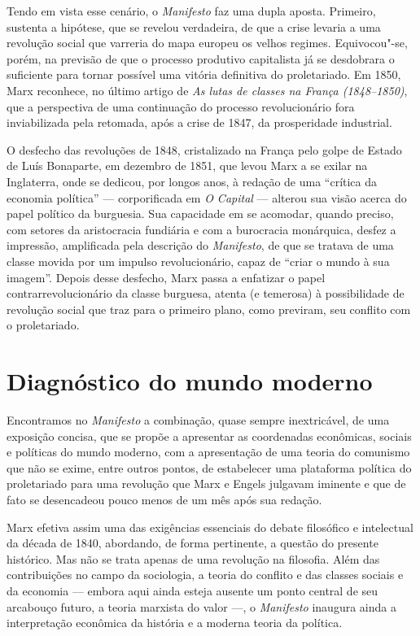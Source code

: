Tendo em vista esse cenário, o \textit{Manifesto} faz uma dupla aposta.
Primeiro, sustenta a hipótese, que se revelou verdadeira, de que a
crise levaria a uma revolução social que varreria do mapa europeu os
velhos regimes. Equivocou"-se, porém, na previsão de que o processo
produtivo capitalista já se desdobrara o suficiente para tornar
possível uma vitória definitiva do proletariado. Em 1850, Marx reconhece, no último artigo de\textit{ As lutas de classes na França 
(1848--1850)}, que a perspectiva de uma continuação do processo
revolucionário fora inviabilizada pela retomada, após a crise de 1847,
da prosperidade industrial.

O desfecho das revoluções de 1848, cristalizado na França pelo golpe de
Estado de Luís Bonaparte, em dezembro de 1851, que levou Marx a se
exilar na Inglaterra, onde se dedicou, por longos anos, à redação de
uma “crítica da economia política” --- corporificada em \textit{O
Capital} --- alterou sua visão acerca do papel político da burguesia.
Sua capacidade em se acomodar, quando preciso, com setores da
aristocracia fundiária e com a burocracia monárquica, desfez a
impressão, amplificada pela descrição do \textit{Manifesto}, de que se
tratava de uma classe movida por um impulso revolucionário, capaz de
“criar o mundo à sua imagem”. Depois desse desfecho, Marx passa a
enfatizar o papel contrarrevolucionário da classe burguesa, atenta (e
temerosa) à possibilidade de revolução social que traz para o primeiro
plano, como previram, seu conflito com o proletariado.

\section*{Diagnóstico do mundo moderno}

Encontramos no \textit{Manifesto} a combinação, quase sempre
inextricável, de uma exposição concisa, que se propõe a apresentar as
coordenadas econômicas, sociais e políticas do mundo moderno, com a
apresentação de uma teoria do comunismo que não se exime, entre outros
pontos, de estabelecer uma plataforma política do proletariado para uma
revolução que Marx e Engels julgavam iminente e que de fato se
desencadeou pouco menos de um mês após sua redação.

Marx efetiva assim uma das exigências essenciais do debate filosófico e
intelectual da década de 1840, abordando, de forma pertinente, a
questão do presente histórico. Mas não se trata apenas de uma revolução
na filosofia. Além das contribuições no campo da sociologia, a teoria
do conflito e das classes sociais e da economia --- embora aqui ainda
esteja ausente um ponto central de seu arcabouço futuro, a teoria
marxista do valor ---, o \textit{Manifesto} inaugura ainda a
interpretação econômica da história e a moderna teoria da política.

